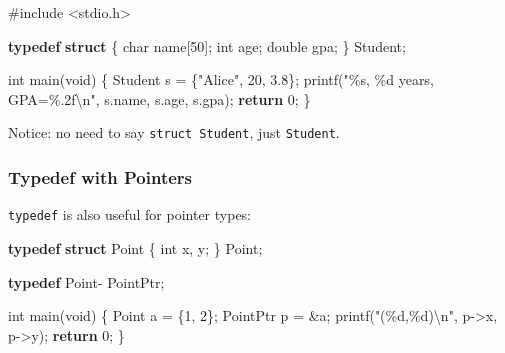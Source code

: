 \documentclass[
  letterpaper,
  DIV=11,
  numbers=noendperiod]{scrreprt}
\newenvironment{Shaded}{\begin{snugshade}}{\end{snugshade}}
\newcommand{\ControlFlowTok}[1]{\textcolor[rgb]{0.00,0.23,0.31}{\textbf{#1}}}
\newcommand{\DataTypeTok}[1]{\textcolor[rgb]{0.68,0.00,0.00}{#1}}
\newcommand{\DecValTok}[1]{\textcolor[rgb]{0.68,0.00,0.00}{#1}}
\newcommand{\FloatTok}[1]{\textcolor[rgb]{0.68,0.00,0.00}{#1}}
\newcommand{\ImportTok}[1]{\textcolor[rgb]{0.00,0.46,0.62}{#1}}
\newcommand{\KeywordTok}[1]{\textcolor[rgb]{0.00,0.23,0.31}{\textbf{#1}}}
\newcommand{\NormalTok}[1]{\textcolor[rgb]{0.00,0.23,0.31}{#1}}
\newcommand{\OperatorTok}[1]{\textcolor[rgb]{0.37,0.37,0.37}{#1}}
\newcommand{\PreprocessorTok}[1]{\textcolor[rgb]{0.68,0.00,0.00}{#1}}
\newcommand{\SpecialCharTok}[1]{\textcolor[rgb]{0.37,0.37,0.37}{#1}}
\newcommand{\StringTok}[1]{\textcolor[rgb]{0.13,0.47,0.30}{#1}}
\begin{document}
\begin{Shaded}
\begin{Highlighting}[]
\PreprocessorTok{\#include }\ImportTok{\textless{}stdio.h\textgreater{}}

\KeywordTok{typedef} \KeywordTok{struct} \OperatorTok{\{}
    \DataTypeTok{char}\NormalTok{ name}\OperatorTok{[}\DecValTok{50}\OperatorTok{];}
    \DataTypeTok{int}\NormalTok{ age}\OperatorTok{;}
    \DataTypeTok{double}\NormalTok{ gpa}\OperatorTok{;}
\OperatorTok{\}}\NormalTok{ Student}\OperatorTok{;}

\DataTypeTok{int}\NormalTok{ main}\OperatorTok{(}\DataTypeTok{void}\OperatorTok{)} \OperatorTok{\{}
\NormalTok{    Student s }\OperatorTok{=} \OperatorTok{\{}\StringTok{"Alice"}\OperatorTok{,} \DecValTok{20}\OperatorTok{,} \FloatTok{3.8}\OperatorTok{\};}
\NormalTok{    printf}\OperatorTok{(}\StringTok{"}\SpecialCharTok{\%s}\StringTok{, }\SpecialCharTok{\%d}\StringTok{ years, GPA=}\SpecialCharTok{\%.2f\textbackslash{}n}\StringTok{"}\OperatorTok{,}\NormalTok{ s}\OperatorTok{.}\NormalTok{name}\OperatorTok{,}\NormalTok{ s}\OperatorTok{.}\NormalTok{age}\OperatorTok{,}\NormalTok{ s}\OperatorTok{.}\NormalTok{gpa}\OperatorTok{);}
    \ControlFlowTok{return} \DecValTok{0}\OperatorTok{;}
\OperatorTok{\}}
\end{Highlighting}
\end{Shaded}

Notice: no need to say \texttt{struct\ Student}, just \texttt{Student}.

\subsubsection{Typedef with Pointers}\label{typedef-with-pointers}

\texttt{typedef} is also useful for pointer types:

\begin{Shaded}
\begin{Highlighting}[]
\KeywordTok{typedef} \KeywordTok{struct}\NormalTok{ Point }\OperatorTok{\{}
    \DataTypeTok{int}\NormalTok{ x}\OperatorTok{,}\NormalTok{ y}\OperatorTok{;}
\OperatorTok{\}}\NormalTok{ Point}\OperatorTok{;}

\KeywordTok{typedef}\NormalTok{ Point}\OperatorTok{{-}}\NormalTok{ PointPtr}\OperatorTok{;}

\DataTypeTok{int}\NormalTok{ main}\OperatorTok{(}\DataTypeTok{void}\OperatorTok{)} \OperatorTok{\{}
\NormalTok{    Point a }\OperatorTok{=} \OperatorTok{\{}\DecValTok{1}\OperatorTok{,} \DecValTok{2}\OperatorTok{\};}
\NormalTok{    PointPtr p }\OperatorTok{=} \OperatorTok{\&}\NormalTok{a}\OperatorTok{;}
\NormalTok{    printf}\OperatorTok{(}\StringTok{"(}\SpecialCharTok{\%d}\StringTok{,}\SpecialCharTok{\%d}\StringTok{)}\SpecialCharTok{\textbackslash{}n}\StringTok{"}\OperatorTok{,}\NormalTok{ p}\OperatorTok{{-}\textgreater{}}\NormalTok{x}\OperatorTok{,}\NormalTok{ p}\OperatorTok{{-}\textgreater{}}\NormalTok{y}\OperatorTok{);}
    \ControlFlowTok{return} \DecValTok{0}\OperatorTok{;}
\OperatorTok{\}}
\end{Highlighting}
\end{Shaded}
\end{document}
